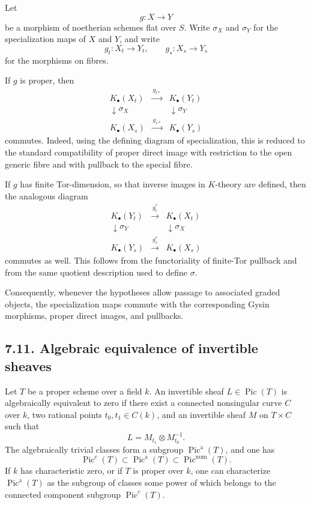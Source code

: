 \documentclass[11pt]{article}
\theoremstyle{plain}
\theoremstyle{definition}
\theoremstyle{remark}
\DeclareMathOperator{\Pic}{Pic}
\newcommand{\longto}{\longrightarrow}
\providecommand{\xto}[1]{\xrightarrow{#1}}
\begin{document}
Let
\[
g:X\longto Y
\]
be a morphism of noetherian schemes flat over $S$. Write $\sigma_X$ and $\sigma_Y$ for the specialization maps of $X$ and $Y$, and write
\[
g_t:X_t\to Y_t,
\qquad
 g_s:X_s\to Y_s
\]
for the morphisms on fibres.

If $g$ is proper, then
\[
\begin{array}{ccc}
K_\bullet(X_t)&\xto{\,g_{t*}\,}&K_\bullet(Y_t)\\
\downarrow\scriptstyle\sigma_X&&\downarrow\scriptstyle\sigma_Y\\
K_\bullet(X_s)&\xto{\,g_{s*}\,}&K_\bullet(Y_s)
\end{array}
\]
commutes. Indeed, using the defining diagram of specialization, this is reduced to the standard compatibility of proper direct image with restriction to the open generic fibre and with pullback to the special fibre.

If $g$ has finite Tor-dimension, so that inverse images in $K$-theory are defined, then the analogous diagram
\[
\begin{array}{ccc}
K_\bullet(Y_t)&\xto{\,g_t^*\,}&K_\bullet(X_t)\\
\downarrow\scriptstyle\sigma_Y&&\downarrow\scriptstyle\sigma_X\\
K_\bullet(Y_s)&\xto{\,g_s^*\,}&K_\bullet(X_s)
\end{array}
\]
commutes as well. This follows from the functoriality of finite-Tor pullback and from the same quotient description used to define $\sigma$.

Consequently, whenever the hypotheses allow passage to associated graded objects, the specialization maps commute with the corresponding Gysin morphisms, proper direct images, and pullbacks.

\subsection*{7.11. Algebraic equivalence of invertible sheaves}

Let $T$ be a proper scheme over a field $k$. An invertible sheaf $L\in\Pic(T)$ is algebraically equivalent to zero if there exist a connected nonsingular curve $C$ over $k$, two rational points $t_0,t_1\in C(k)$, and an invertible sheaf $M$ on $T\times C$ such that
\[
L=M_{t_1}\otimes M_{t_0}^{-1}.
\]
The algebraically trivial classes form a subgroup $\Pic^{\mathrm a}(T)$, and one has
\[
\Pic^c(T)\subset \Pic^{\mathrm a}(T)\subset\Pic^{\mathrm{num}}(T).
\]
If $k$ has characteristic zero, or if $T$ is proper over $k$, one can characterize $\Pic^{\mathrm a}(T)$ as the subgroup of classes some power of which belongs to the connected component subgroup $\Pic^c(T)$.
\end{document}

